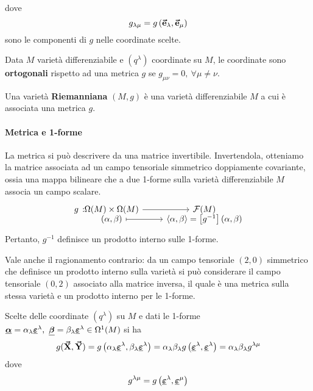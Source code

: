 dove
\begin{equation}
	g_{\lambda \mu}=g\left(\vb*{\va{e}}_\lambda,\vb*{\va{e}}_\mu\right)
\end{equation}
sono le componenti di $g$ nelle coordinate scelte.
\begin{define}
	Data $M$ varietà differenziabile e $\left(q^\lambda\right)$ coordinate su $M$, le coordinate sono \textbf{ortogonali} rispetto ad una metrica $g$ se $g_{\mu\nu}=0,\ \forall \mu\neq\nu$.
\end{define}
\begin{define}
	Una varietà \textbf{Riemanniana} $\left(M,g\right)$ è una varietà differenziabile $M$ a cui è associata una metrica $g$.
\end{define}
\paragraph{Metrica e 1-forme}
La metrica  si può descrivere da una matrice invertibile. Invertendola, otteniamo la matrice associata ad un campo tensoriale simmetrico doppiamente covariante, ossia una mappa bilineare che a due 1-forme sulla varietà differenziabile $M$ associa un campo scalare.
\begin{equation}
	\funztot[g]{\Omega(M)\times \Omega(M)}{\mathcal{F}(M)}{\left(\alpha,\beta\right)}{\left<\alpha,\beta\right>=\left[g^{-1}\right](\alpha,\beta)}
\end{equation}
Pertanto, $g^{-1}$ definisce un prodotto interno sulle 1-forme. 
\begin{observe}%
	Vale anche il ragionamento contrario: da un campo tensoriale $(2,0)$ simmetrico che definisce un prodotto interno sulla varietà si può considerare il campo tensoriale $(0,2)$ associato alla matrice inversa, il quale è una metrica sulla stessa varietà e un prodotto interno per le 1-forme.
\end{observe}
Scelte delle coordinate $(q^\lambda)$ su $M$ e dati le 1-forme $\fb{\alpha}=\alpha_{\lambda}\fb{\epsilon}^\lambda,\ \fb{\beta}=\beta_{\lambda}\fb{\epsilon}^\lambda\in\Omega^1(M)$ si ha
\begin{equation*}
	g(\vb*{\va{X}},\vb*{\va{Y}})=g\left(\alpha_{\lambda}\vb*{\underline{\varepsilon}}^\lambda,\beta_{\lambda}\vb*{\underline{\varepsilon}}^\lambda\right)=\alpha_{\lambda} \beta_{\lambda} g\left(\vb*{\underline{\varepsilon}}^\lambda,\vb*{\underline{\varepsilon}}^\lambda\right)=\alpha_{\lambda} \beta_{\lambda} g^{\lambda \mu}
\end{equation*}
dove
\begin{equation}
	g^{\lambda \mu}=g\left(\vb*{\underline{\varepsilon}}^\lambda,\vb*{\underline{\varepsilon}}^\mu\right)
\end{equation}
